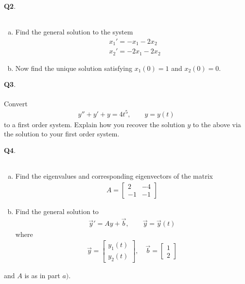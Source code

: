 \documentclass[12pt, oneside]{amsart}
\begin{document}
\newpage
\noindent
\textbf{Q2}. \\ \\ 
\begin{enumerate}[a)]
    \item
Find the general solution to the system
\begin{equation*}
\begin{split}
& x_1' = -x_1 - 2x_2
\\
& x_2' = -2x_1 - 2 x_2
\end{split}
\end{equation*}



\vspace{5in}
\item
    Now find the unique solution satisfying $x_1(0) = 1$ and $x_2(0) = 0$. 
\end{enumerate}

\newpage
\noindent
\textbf{Q3}. \\ \\ 
Convert
\begin{align*}
y'' + y' + y = 4t^5, \qquad y = y(t)
\end{align*}
to a first order system. Explain how you recover the solution $y$
to the above via the solution to your first order system.
        \newpage

\noindent
\textbf{Q4}. \\ \\ 
\begin{enumerate}[a)]
\item
Find the eigenvalues and corresponding eigenvectors of the matrix
\begin{align*}
A = \begin{bmatrix}
2 & -4 \\
-1 & -1
\end{bmatrix}
\end{align*}
\vspace{3in}
\item
Find the general solution to
\begin{align*}
\vec{y}' = Ay + \vec{b}, \qquad \vec{y} = \vec{y}(t)
\end{align*}
where
\begin{align*}
\vec{y} = \begin{bmatrix}
y_1(t) \\
y_2(t)
\end{bmatrix}, \quad
\vec{b} = \begin{bmatrix}
1 \\
2
\end{bmatrix}
\end{align*}
\end{enumerate}
and $A$ is as in part $a)$.
        \newpage
\end{document}
